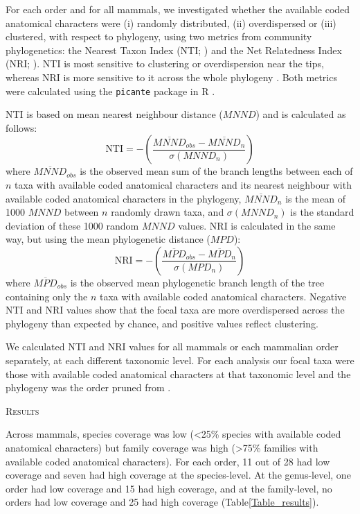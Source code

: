 \documentclass[12pt,letterpaper]{article}
\renewcommand{\section}[1]{%
\bigskip
\begin{center}
\begin{Large}
\normalfont\scshape #1
\medskip
\end{Large}
\end{center}}
\begin{document}
For each order and for all mammals, we investigated whether the available coded anatomical characters were (i) randomly distributed, (ii) overdispersed or (iii) clustered, with respect to phylogeny, using two metrics from community phylogenetics: the Nearest Taxon Index (NTI; \cite{webb2002phylogenies}) and the Net Relatedness Index (NRI; \cite{webb2002phylogenies}). 
NTI is most sensitive to clustering or overdispersion near the tips, whereas NRI is more sensitive to it across the whole phylogeny \cite{Cooper2008}. 
Both metrics were calculated using the \texttt{picante} package in R \cite{picante,R}.

NTI \cite{webb2002phylogenies} is based on mean nearest neighbour distance ($MNND$) and is calculated as follows:
  \begin{equation}
    \text{NTI}=-\left(\frac{\overline{MNND}_{obs}-\overline{MNND}_{n}}{\sigma(MNND_{n})}\right)
  \end{equation}
where $\overline{MNND}_{obs}$ is the observed mean sum of the branch lengths between each of $n$ taxa with available coded anatomical characters and its nearest neighbour with available coded anatomical characters in the phylogeny, 
$\overline{MNND}_{n}$ is the mean of 1000 $MNND$ between $n$ randomly drawn taxa, and $\sigma(MNND_{n})$ is the standard deviation of these 1000 random $MNND$ values.
NRI is calculated in the same way, but using the mean phylogenetic distance ($MPD$):
  \begin{equation}
    \text{NRI}=-\left(\frac{\overline{MPD}_{obs}-\overline{MPD}_{n}}{\sigma(MPD_{n})}\right)
  \end{equation}
where $\overline{MPD}_{obs}$ is the observed mean phylogenetic branch length of the tree containing only the $n$ taxa with available coded anatomical characters.
Negative NTI and NRI values show that the focal taxa are more overdispersed across the phylogeny than expected by chance, and positive values reflect clustering.

We calculated NTI and NRI values for all mammals or each mammalian order separately, at each different taxonomic level. 
For each analysis our focal taxa were those with available coded anatomical characters at that taxonomic level and the phylogeny was the order pruned from \cite{BinindaEmonds}.

%
%


\section{Results}
Across mammals, species coverage was low (\textless 25\% species with available coded anatomical characters) but family coverage was high (\textgreater 75\% families with available coded anatomical characters).
For each order, 11 out of 28 had low coverage and seven had high coverage at the species-level.
At the genus-level, one order had low coverage and 15 had high coverage, and at the family-level, no orders had low coverage and 25 had high coverage (Table\ref{Table_results}).
\end{document}

